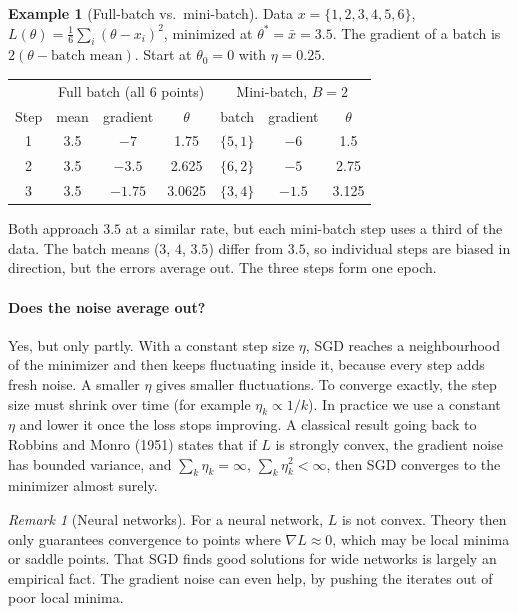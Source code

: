 \documentclass[11pt]{article}
\theoremstyle{definition}
\newtheorem{example}[theorem]{Example}
\theoremstyle{remark}
\newtheorem{remark}[theorem]{Remark}
\begin{document}
\begin{example}[Full-batch vs.\ mini-batch]
Data $x=\{1,2,3,4,5,6\}$, $L(\theta)=\frac16\sum_i(\theta-x_i)^2$, minimized at $\theta^*=\bar x=3.5$.
The gradient of a batch is $2(\theta-\text{batch mean})$. Start at $\theta_0=0$ with $\eta=0.25$.

\begin{center}
\renewcommand{\arraystretch}{1.3}
\begin{tabular}{@{}c|ccc|ccc@{}}
\toprule
 & \multicolumn{3}{c|}{Full batch (all 6 points)} & \multicolumn{3}{c}{Mini-batch, $B=2$}\\
Step & mean & gradient & $\theta$ & batch & gradient & $\theta$\\
\midrule
1 & 3.5 & $-7$ & 1.75 & $\{5,1\}$ & $-6$ & 1.5\\
2 & 3.5 & $-3.5$ & 2.625 & $\{6,2\}$ & $-5$ & 2.75\\
3 & 3.5 & $-1.75$ & 3.0625 & $\{3,4\}$ & $-1.5$ & 3.125\\
\bottomrule
\end{tabular}
\end{center}
Both approach $3.5$ at a similar rate, but each mini-batch step uses a third of the data. The batch means ($3$, $4$, $3.5$)
differ from $3.5$, so individual steps are biased in direction, but the errors average out. The three steps form one epoch.
\end{example}

\paragraph{Does the noise average out?} Yes, but only partly. With a constant step size $\eta$, SGD reaches a neighbourhood of the minimizer and then keeps fluctuating inside it, because every step adds fresh noise. A smaller $\eta$ gives smaller fluctuations. To converge exactly, the step size must shrink over time (for example $\eta_k\propto1/k$). In practice we use a constant $\eta$ and lower it once the loss stops improving. A classical result going back to Robbins and Monro (1951) states that if $L$ is strongly convex, the gradient noise has bounded variance, and $\sum_k\eta_k=\infty$, $\sum_k\eta_k^2<\infty$, then SGD converges to the minimizer almost surely.


\begin{remark}[Neural networks]
For a neural network, $L$ is not convex. Theory then only guarantees convergence to points where $\nabla L\approx0$, which may be local
minima or saddle points. That SGD finds good solutions for wide networks is largely an empirical fact. The gradient noise can even help,
by pushing the iterates out of poor local minima.
\end{remark}
\end{document}
